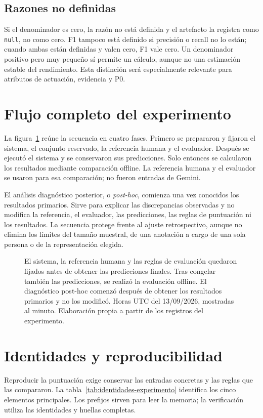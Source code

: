 \subsection{Razones no definidas}
Si el denominador es cero, la razón no está definida y el artefacto la
registra como \texttt{null}, no como cero. F1 tampoco está definido si
precisión o recall no lo están; cuando ambas están definidas y valen cero,
F1 vale cero. Un denominador positivo pero muy pequeño sí permite un cálculo,
aunque no una estimación estable del rendimiento. Esta distinción será
especialmente relevante para atributos de actuación, evidencia y P0.

\section{Flujo completo del experimento}
La figura~\ref{fig:metodologia-experimental} reúne la secuencia en cuatro
fases. Primero se prepararon y fijaron el sistema, el conjunto reservado,
la referencia humana y el evaluador. Después se ejecutó el sistema y se
conservaron sus predicciones. Solo entonces se calcularon los resultados
mediante comparación offline. La referencia humana y el evaluador se usaron
para esa comparación; no fueron entradas de Gemini.

El análisis diagnóstico posterior, o \emph{post-hoc}, comienza una vez
conocidos los resultados primarios. Sirve para explicar las discrepancias
observadas y no modifica la referencia, el evaluador, las predicciones,
las reglas de puntuación ni los resultados. La secuencia protege frente
al ajuste retrospectivo, aunque no elimina los límites del tamaño muestral,
de una anotación a cargo de una sola persona o de la representación elegida.

\begin{figure}[p]
\centering

\caption[Diseño y congelaciones del experimento]{El sistema, la referencia
humana y las reglas de evaluación quedaron fijados antes de obtener las
predicciones finales. Tras congelar también las predicciones, se realizó
la evaluación offline. El diagnóstico post-hoc comenzó después de obtener
los resultados primarios y no los modificó. Horas UTC del 13/09/2026,
mostradas al minuto. Elaboración propia a partir de los registros del experimento.}
\label{fig:metodologia-experimental}
\end{figure}

\section{Identidades y reproducibilidad}
\label{sec:reproducibilidad-experimental}
Reproducir la puntuación exige conservar las entradas concretas y las reglas
que las compararon. La tabla~\ref{tab:identidades-experimento} identifica los
cinco elementos principales. Los prefijos sirven para leer la memoria;
la verificación utiliza las identidades y huellas completas.

